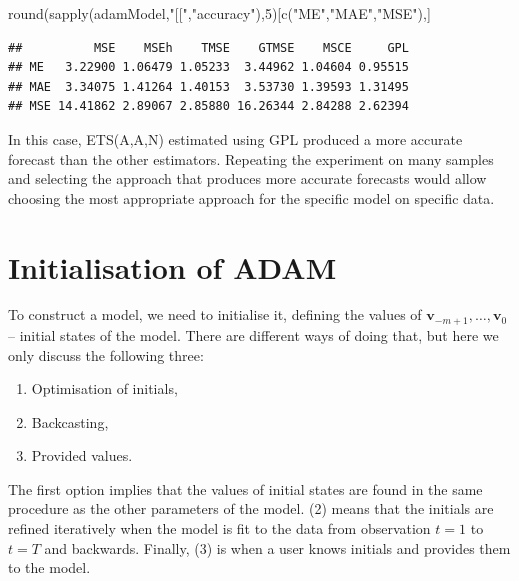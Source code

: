 \documentclass[
]{book}
\newenvironment{Shaded}{\begin{snugshade}}{\end{snugshade}}
\newcommand{\DecValTok}[1]{\textcolor[rgb]{0.00,0.00,0.81}{#1}}
\newcommand{\FunctionTok}[1]{\textcolor[rgb]{0.00,0.00,0.00}{#1}}
\newcommand{\NormalTok}[1]{#1}
\newcommand{\StringTok}[1]{\textcolor[rgb]{0.31,0.60,0.02}{#1}}
\providecommand{\tightlist}{%
  \setlength{\itemsep}{0pt}\setlength{\parskip}{0pt}}
\theoremstyle{definition}
\theoremstyle{definition}
\theoremstyle{definition}
\theoremstyle{definition}
\theoremstyle{remark}
\begin{document}
\begin{Shaded}
\begin{Highlighting}[]
\FunctionTok{round}\NormalTok{(}\FunctionTok{sapply}\NormalTok{(adamModel,}\StringTok{"[["}\NormalTok{,}\StringTok{"accuracy"}\NormalTok{),}\DecValTok{5}\NormalTok{)[}\FunctionTok{c}\NormalTok{(}\StringTok{"ME"}\NormalTok{,}\StringTok{"MAE"}\NormalTok{,}\StringTok{"MSE"}\NormalTok{),]}
\end{Highlighting}
\end{Shaded}

\begin{verbatim}
##          MSE    MSEh    TMSE    GTMSE    MSCE     GPL
## ME   3.22900 1.06479 1.05233  3.44962 1.04604 0.95515
## MAE  3.34075 1.41264 1.40153  3.53730 1.39593 1.31495
## MSE 14.41862 2.89067 2.85880 16.26344 2.84288 2.62394
\end{verbatim}

In this case, ETS(A,A,N) estimated using GPL produced a more accurate forecast than the other estimators. Repeating the experiment on many samples and selecting the approach that produces more accurate forecasts would allow choosing the most appropriate approach for the specific model on specific data.

\hypertarget{ADAMInitialisation}{%
\section{Initialisation of ADAM}\label{ADAMInitialisation}}

To construct a model, we need to initialise it, defining the values of \(\mathbf{v}_{-m+1}, \dots, \mathbf{v}_0\) -- initial states of the model. There are different ways of doing that, but here we only discuss the following three:

\begin{enumerate}
\def\labelenumi{\arabic{enumi}.}
\tightlist
\item
  Optimisation of initials,
\item
  Backcasting,
\item
  Provided values.
\end{enumerate}

The first option implies that the values of initial states are found in the same procedure as the other parameters of the model. (2) means that the initials are refined iteratively when the model is fit to the data from observation \(t=1\) to \(t=T\) and backwards. Finally, (3) is when a user knows initials and provides them to the model.
\end{document}
